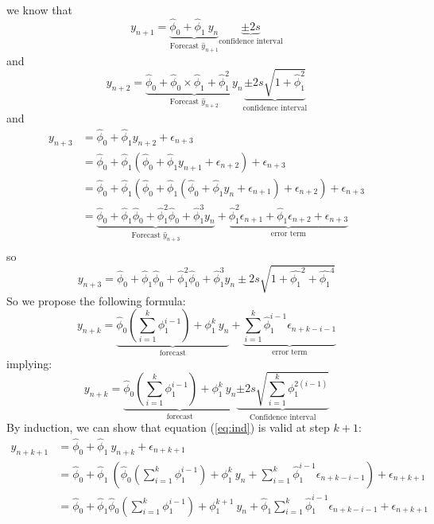 \documentclass[a4paper,11pt,oneside,onecolumn]{book}
\begin{document}
\begin{enumerate}
we know that 
$$
y_{n+1} = \underbrace{\hat{\phi}_0+\hat{\phi}_1\ y_n}_{\text{Forecast $\hat{y}_{n+1}$}} \underbrace{\pm 2 s }_{\text{confidence interval}}
$$ 
and
$$
y_{n+2} = \underbrace{\hat{\phi}_0 + \hat{\phi}_0\times\hat{\phi}_1+\hat{\phi}_1^2\ y_n}_{\text{Forecast $\hat{y}_{n+2}$}} \underbrace{\pm 2 s \sqrt{1+\hat{\phi}_1^2}}_{\text{confidence interval}}
$$
and 
$$
\begin{array}{ll}
y_{n+3} &= \hat{\phi}_0+\hat{\phi}_1 y_{n+2}+\epsilon_{n+3}\\
&= \hat{\phi}_0+\hat{\phi}_1 (\hat{\phi}_0+\hat{\phi}_1 y_{n+1}+\epsilon_{n+2})+\epsilon_{n+3}\\
&= \hat{\phi}_0+\hat{\phi}_1 (\hat{\phi}_0+\hat{\phi}_1 (\hat{\phi}_0+\hat{\phi}_1 y_{n}+\epsilon_{n+1})+\epsilon_{n+2})+\epsilon_{n+3}\\
&
= \underbrace{\hat{\phi}_0+\hat{\phi}_1 \hat{\phi}_0+\hat{\phi}^2_1 \hat{\phi}_0+\hat{\phi}_1^3 y_{n}}_{\text{Forecast $\hat{y}_{n+3}$}}+\underbrace{\hat{\phi}_1^2\epsilon_{n+1}+\hat{\phi}_1\epsilon_{n+2}+\epsilon_{n+3}}_{\text{error term}}\\
\end{array}
$$
so
$$
y_{n+3}=\hat{\phi}_0+\hat{\phi}_1 \hat{\phi}_0+\hat{\phi}^2_1 \hat{\phi}_0+\hat{\phi}_1^3 y_{n} \pm 2s \sqrt{1+\hat{\phi_1}^2+\hat{\phi_1}^4}
$$
So we propose the following formula: 
\begin{equation}
y_{n+k}=\underbrace{\hat{\phi}_0\left( \sum_{i=1}^{k} \phi_1^{i-1}\right)+\phi_1^k \ y_n }_{\text{forecast}}+\underbrace{\sum_{i=1}^k \hat{\phi}_1^{i-1} \epsilon_{n+k-i-1}}_{\text{error term}}
\label{eq:ind}
\end{equation}
implying:
\begin{equation}
y_{n+k}=\underbrace{\hat{\phi}_0\left( \sum_{i=1}^{k} \phi_1^{i-1}\right)+\phi_1^k \ y_n }_{\text{forecast}}\underbrace{\pm 2s\sqrt{\sum_{i=1}^{k} \phi_1^{2(i-1)}} }_{\text{Confidence interval}}\label{eq:AR1:confidence}
\end{equation}
By induction, we can show that equation (\ref{eq:ind}) is valid at step $k+1$:
$$
\begin{array}{ll}
y_{n+k+1}&=\hat{\phi}_0+\hat{\phi}_1 \ y_{n+k}+\epsilon_{n+k+1}\\
&=\hat{\phi}_0+\hat{\phi}_1 \ \left(\hat{\phi}_0\left( \sum_{i=1}^{k} \phi_1^{i-1}\right)+\phi_1^k \ y_n +\sum_{i=1}^k \hat{\phi}_1^{i-1} \epsilon_{n+k-i-1}\right) +\epsilon_{n+k+1}\\
&=\hat{\phi}_0+\hat{\phi}_1 \hat{\phi}_0\left( \sum_{i=1}^{k} \phi_1^{i-1}\right)+\phi_1^{k+1} \ y_n +\hat{\phi}_1 \sum_{i=1}^k \hat{\phi}_1^{i-1} \epsilon_{n+k-i-1} +\epsilon_{n+k+1}\\

\end{array}$$
\end{enumerate}
\end{document}
